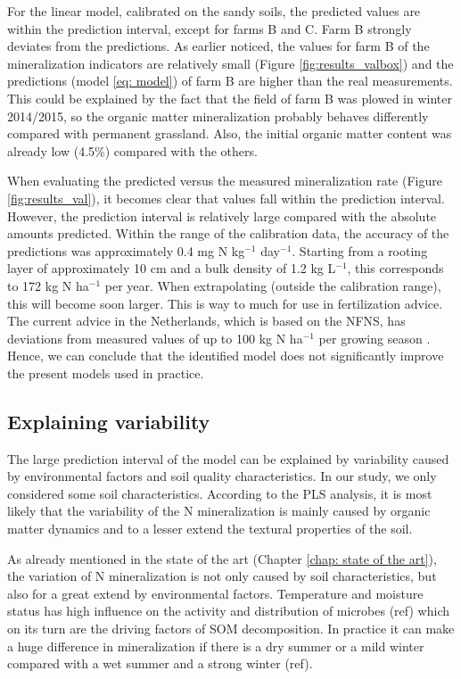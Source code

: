 \documentclass[10pt,twoside,dutch,english]{report}
\begin{document}
For the linear model, calibrated on the sandy soils, the predicted values are within the prediction interval, except for farms B and C. Farm B strongly deviates from the predictions. As earlier noticed, the values for farm B of the mineralization indicators are relatively small (Figure \ref{fig:results_valbox}) and the predictions (model \ref{eq: model}) of farm B are higher than the real measurements. This could be explained by the fact that the field of farm B was plowed in winter 2014/2015, so the organic matter mineralization probably behaves differently compared with permanent grassland. Also, the initial organic matter content was already low (4.5\%) compared with the others. 


When evaluating the predicted versus the measured mineralization rate (Figure \ref{fig:results_val}), it becomes clear that values fall within the prediction interval. However, the prediction interval is relatively large compared with the absolute amounts predicted.
Within the range of the calibration data, the accuracy of the predictions was approximately 0.4 mg N kg$^{-1}$ day$^{-1}$. Starting from a rooting layer of approximately 10 cm and a bulk density of 1.2 kg L$^{-1}$, this corresponds to 172  kg N ha$^{-1}$ per year. When extrapolating (outside the calibration range), this will become soon larger. This is way to much for use in fertilization advice. The current advice in the Netherlands, which is based on the NFNS, has deviations from measured values of up to 100 kg N ha$^{-1}$ per growing season \citep{Ros2015}. Hence, we can conclude that the identified model does not significantly improve the present models used in practice. 






\subsection{Explaining variability}
The large prediction interval of the model can be explained by variability caused by environmental factors and soil quality characteristics. In our study, we only considered some soil characteristics. According to the PLS analysis, it is most likely that the variability of the N mineralization is mainly caused by organic matter dynamics and to a lesser extend the textural properties of the soil.

    As already mentioned in the state of the art (Chapter \ref{chap: state of the art}), the variation of N mineralization is not only caused by soil characteristics, but also for a great extend by environmental factors. Temperature and moisture status has high influence on the activity and distribution of microbes (ref) which on its turn are the driving factors of SOM decomposition. In practice it can make a huge difference in mineralization if there is a dry summer or a mild winter compared with a wet summer and a strong winter (ref). 
\end{document}
